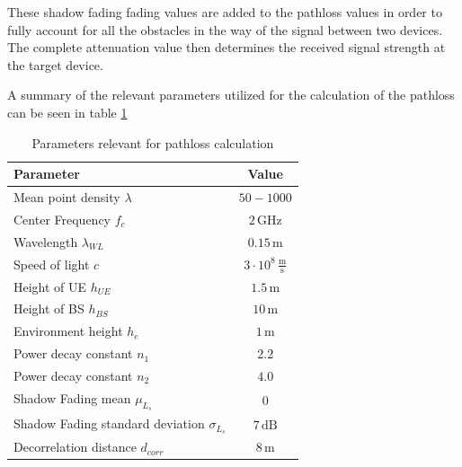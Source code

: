 These shadow fading fading values are added to the pathloss values in order to fully account for all the obstacles in the way of the signal between two devices. The complete attenuation value then determines the received signal strength at the target device.

A summary of the relevant parameters utilized for the calculation of the pathloss can be seen in table \ref{tbl:PL}

\begin{table}[H]
\begin{center}
 \begin{tabular}{||p{7cm}|p{2.5cm}||} 
 \hline
 \textbf{Parameter} & \multicolumn{1}{|c||}{\textbf{Value}}\\
 \hline\hline
 Mean point density $\lambda$ & \multicolumn{1}{|c||}{$50 - 1000$} \\ 
 \hline
 Center Frequency $f_c$& \multicolumn{1}{|c||}{$2\,\text{GHz}$} \\
 \hline
 Wavelength $\lambda_{WL}$ & \multicolumn{1}{|c||}{$0.15\,\text{m}$}\\
 \hline
 Speed of light $c$ & \multicolumn{1}{|c||}{$3 \cdot 10^8\,\frac{\text{m}}{\text{s}}$}\\
 \hline
 Height of UE $h_{UE}$ & \multicolumn{1}{|c||}{$1.5\,\text{m}$} \\
 \hline
 Height of BS $h_{BS}$ & \multicolumn{1}{|c||}{$10\,\text{m}$} \\
 \hline
 Environment height $h_e$ & \multicolumn{1}{|c||}{$1\,\text{m}$} \\
 \hline
 Power decay constant $n_1$ & \multicolumn{1}{|c||}{$2.2$}\\
 \hline
 Power decay constant $n_2$ & \multicolumn{1}{|c||}{$4.0$}\\
 \hline
 Shadow Fading mean $\mu_{L_s}$ &\multicolumn{1}{|c||}{$0$} \\
 \hline
 Shadow Fading standard deviation $\sigma_{L_s}$ & \multicolumn{1}{|c||}{$7\,\text{dB}$}\\
 \hline
 Decorrelation distance $d_{corr}$ &\multicolumn{1}{|c||}{$8\,\text{m}$}\\
 \hline
\end{tabular}
\end{center}
\caption{Parameters relevant for pathloss calculation}
\label{tbl:PL}
\end{table}

